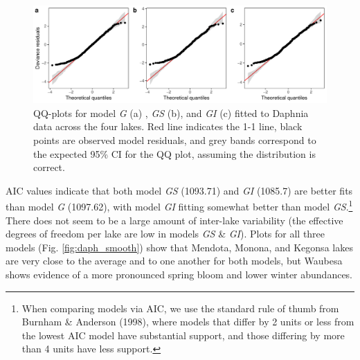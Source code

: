 \documentclass[12pt]{article}
\let\rmarkdownfootnote\footnote%
\def\footnote{\protect\rmarkdownfootnote}
\begin{document}
\begin{figure}
\centering
\includegraphics{../figures/zoo_daph_diag-1.pdf}
\caption{\label{fig:zoo_daph_diag_plot} QQ-plots for model \emph{G} (a)
, \emph{GS} (b), and \emph{GI} (c) fitted to Daphnia data across the
four lakes. Red line indicates the 1-1 line, black points are observed
model residuals, and grey bands correspond to the expected 95\% CI for
the QQ plot, assuming the distribution is correct.}
\end{figure}

AIC values indicate that both model \emph{GS} (1093.71) and \emph{GI}
(1085.7) are better fits than model \emph{G} (1097.62), with model
\emph{GI} fitting somewhat better than model \emph{GS}.\footnote{When
  comparing models via AIC, we use the standard rule of thumb from
  Burnham \& Anderson (1998), where models that differ by 2 units or
  less from the lowest AIC model have substantial support, and those
  differing by more than 4 units have less support.} There does not seem
to be a large amount of inter-lake variability (the effective degrees of
freedom per lake are low in models \emph{GS} \& \emph{GI}). Plots for
all three models (Fig. \ref{fig:daph_smooth}) show that Mendota, Monona,
and Kegonsa lakes are very close to the average and to one another for
both models, but Waubesa shows evidence of a more pronounced spring
bloom and lower winter abundances.
\end{document}
